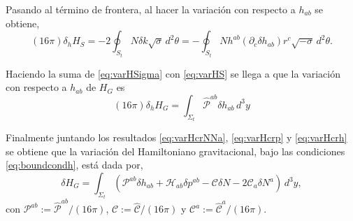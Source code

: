 Pasando al t\'{e}rmino de frontera, al hacer la variaci\'{o}n con respecto a $h_{ab}$ se obtiene,
%
\begin{equation}
\label{eq:varHS}
(16 \pi) \delta_{h} H_{S} = -2 \oint_{S_{t}} N \delta k \sqrt{\sigma} \, d^{2} \theta = - \oint_{S_{t}} N h^{ab} (\partial_{c} \delta h_{ab}) r^{c} \sqrt{- \sigma} \, d^{2} \theta.
\end{equation}

Haciendo la suma de \eqref{eq:varHSigma} con \eqref{eq:varHS} se llega a que la variaci\'{o}n con respecto a $h_{ab}$ de $H_{G}$ es
%
\begin{equation}
\label{eq:varHcrh}
(16 \pi) \delta_{h} H_{G} = \int_{\Sigma_{t}} \hat{\mathcal{P}}^{ab} \delta h_{ab} \, d^{3} y
\end{equation}

Finalmente juntando los resultados \eqref{eq:varHcrNNa}, \eqref{eq:varHcrp} y \eqref{eq:varHcrh} se obtiene que la variaci\'{o}n del Hamiltoniano gravitacional, bajo las condiciones \eqref{eq:boundcondh}, est\'{a} dada por,
%
\begin{equation}
\label{eq:varHG}
\delta H_{G} = \int_{\Sigma_{t}} \left( \mathcal{P}^{ab} \delta h_{ab} + \mathcal{H}_{ab} \delta p^{ab} - \mathcal{C} \delta N - 2 \mathcal{C}_{a} \delta N^{a} \right) \, d^{3} y,
\end{equation}
%
con $\mathcal{P}^{ab} := \hat{\mathcal{P}}^{ab} / (16 \pi)$, $\mathcal{C} := \hat{\mathcal{C}} / (16 \pi)$ y $\mathcal{C}^{a} := \hat{\mathcal{C}}^{a} / (16 \pi)$.

